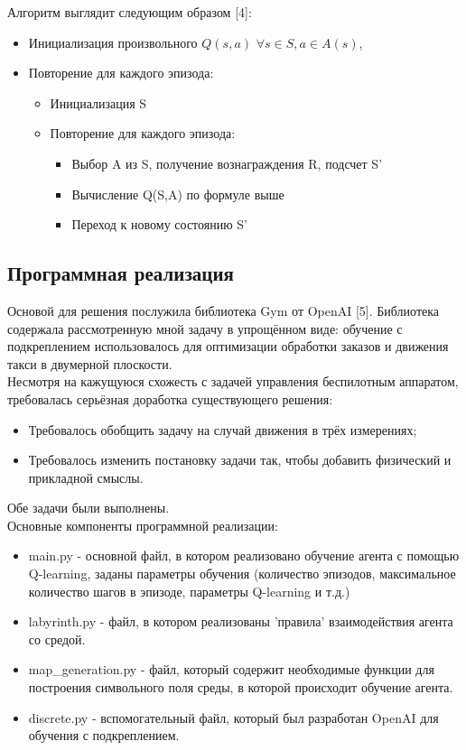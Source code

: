\documentclass[a4paper]{report}
\theoremstyle{definition}
\theoremstyle{plain}
\theoremstyle{remark}
\theoremstyle{remark}
\theoremstyle{definition}
\begin{document}
Алгоритм выглядит следующим образом [4]:
\begin{itemize}
    \item Инициализация произвольного $Q(s,a)$ $\forall s \in S, a \in A(s)$,
    \item Повторение для каждого эпизода:
    \begin{itemize}
        \item Инициализация S
        \item Повторение для каждого эпизода:
        \begin{itemize}
            \item Выбор A из S, получение вознаграждения R, подсчет S'
            \item Вычисление Q(S,A) по формуле выше
            \item Переход к новому состоянию S'
        \end{itemize}
    \end{itemize}
\end{itemize}


\newpage
\begin{center}
\section{Программная реализация}
\end{center}

Основой для решения послужила библиотека Gym от OpenAI [5]. Библиотека содержала рассмотренную мной задачу в упрощённом виде: обучение с подкреплением использовалось для оптимизации обработки заказов и движения такси в двумерной плоскости.\\
Несмотря на кажущуюся схожесть с задачей управления беспилотным аппаратом, требовалась серьёзная доработка существующего решения:
\begin{itemize}
\item Требовалось обобщить задачу на случай движения в трёх измерениях;
\item Требовалось изменить постановку задачи так, чтобы добавить физический и прикладной смыслы.
 \end{itemize}

Обе задачи были выполнены.\\ 

Основные компоненты программной реализации:
\begin{itemize}
\item main.py - основной файл, в котором реализовано обучение агента с помощью Q-learning, заданы параметры обучения (количество эпизодов, максимальное количество шагов в эпизоде, параметры Q-learning и т.д.)
\item labyrinth.py - файл, в котором реализованы 'правила' взаимодействия агента со средой.
\item map\_generation.py - файл, который содержит необходимые функции для построения символьного поля среды, в которой происходит обучение агента.
\item discrete.py - вспомогательный файл, который был разработан OpenAI для обучения с подкреплением.
 \end{itemize}
\end{document}
